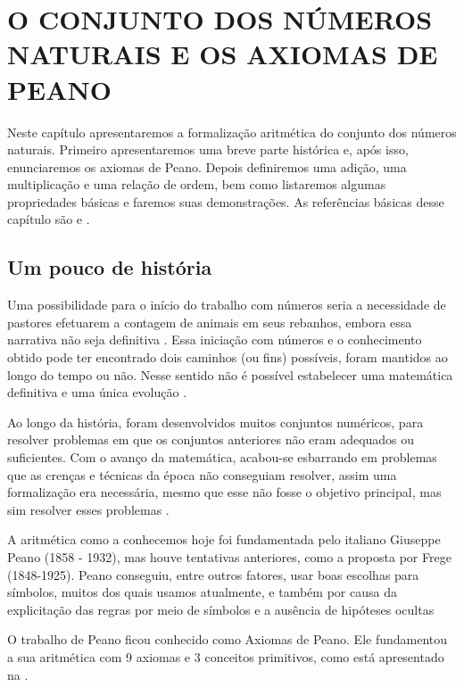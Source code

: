 \documentclass[../main.tex]{subfiles}
\begin{document}
\chapter{O CONJUNTO DOS NÚMEROS NATURAIS E OS AXIOMAS DE PEANO}\label{cap-naturais}
 
Neste capítulo apresentaremos a formalização aritmética do conjunto dos números naturais. Primeiro apresentaremos uma breve parte histórica e, após isso, enunciaremos os axiomas de Peano. Depois definiremos uma adição, uma multiplicação e uma relação de ordem, bem como listaremos algumas propriedades básicas e faremos suas demonstrações. As referências básicas desse capítulo são \textcite{domingues-2009} e \textcite{ferreira}.

\section{Um pouco de história}

Uma possibilidade para o início do trabalho com números seria a necessidade de pastores efetuarem a contagem de animais em seus rebanhos, embora essa narrativa não seja definitiva \Cite{roque}. Essa iniciação com números e o conhecimento obtido pode ter encontrado dois caminhos (ou fins) possíveis, foram mantidos ao longo do tempo ou não. Nesse sentido não é possível estabelecer uma matemática definitiva e uma única evolução \Cite[p. 35]{roque}. 

Ao longo da história, foram desenvolvidos muitos conjuntos numéricos, para resolver problemas em que os conjuntos anteriores não eram adequados ou suficientes. 
Com o avanço da matemática, acabou-se esbarrando em problemas que as crenças e técnicas da época não conseguiam resolver, assim uma formalização era necessária, mesmo que esse não fosse o objetivo principal, mas sim resolver esses problemas \Cite[p. 407]{roque}.

A aritmética como a conhecemos hoje foi fundamentada pelo italiano Giuseppe Peano (1858 - 1932), mas houve tentativas anteriores, como a proposta por Frege (1848-1925). 
Peano conseguiu, entre outros fatores, usar boas escolhas para símbolos, muitos dos quais usamos atualmente, e também por causa da explicitação das regras por meio de símbolos e a ausência de hipóteses ocultas \Cite[p. 415]{boyer}

O trabalho de Peano ficou conhecido como Axiomas de Peano. Ele fundamentou a sua aritmética com 9 axiomas e 3 conceitos primitivos, como está apresentado na .
\end{document}
